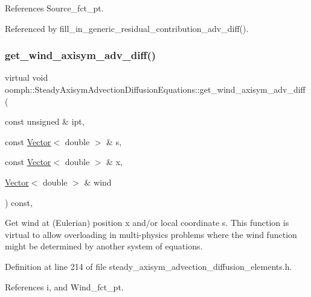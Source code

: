 References Source\+\_\+fct\+\_\+pt.



Referenced by fill\+\_\+in\+\_\+generic\+\_\+residual\+\_\+contribution\+\_\+adv\+\_\+diff().

\mbox{\label{classoomph_1_1SteadyAxisymAdvectionDiffusionEquations_a256417c37083a6146991b4d2098e0fa4}} 
\subsubsection{\texorpdfstring{get\+\_\+wind\+\_\+axisym\+\_\+adv\+\_\+diff()}{get\_wind\_axisym\_adv\_diff()}}
{\footnotesize\ttfamily virtual void oomph\+::\+Steady\+Axisym\+Advection\+Diffusion\+Equations\+::get\+\_\+wind\+\_\+axisym\+\_\+adv\+\_\+diff (\begin{DoxyParamCaption}\item[{const unsigned \&}]{ipt,  }\item[{const \hyperlink{classoomph_1_1Vector}{Vector}$<$ double $>$ \&}]{s,  }\item[{const \hyperlink{classoomph_1_1Vector}{Vector}$<$ double $>$ \&}]{x,  }\item[{\hyperlink{classoomph_1_1Vector}{Vector}$<$ double $>$ \&}]{wind }\end{DoxyParamCaption}) const\hspace{0.3cm}{\ttfamily [inline]}, {\ttfamily [virtual]}}



Get wind at (Eulerian) position x and/or local coordinate s. This function is virtual to allow overloading in multi-\/physics problems where the wind function might be determined by another system of equations. 



Definition at line 214 of file steady\+\_\+axisym\+\_\+advection\+\_\+diffusion\+\_\+elements.\+h.



References i, and Wind\+\_\+fct\+\_\+pt.



